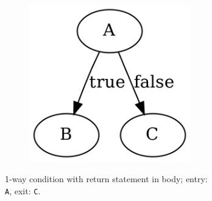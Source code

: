 \begin{savenotes}
\begin{figure}[htbp]
\begin{subfigure}[ht]{0.28\textwidth}
			\label{fig:if_else_graph_representation}
		\end{subfigure}
		\qquad
		\begin{subfigure}[ht]{0.30\textwidth}
			\centering
			\begin{subfigure}[ht]{0.45\textwidth}
				
			\end{subfigure}
			\begin{subfigure}[ht]{0.50\textwidth}
				\includegraphics[width=\textwidth]{inc/primitives/if_return.png}
			\end{subfigure}
			\caption{1-way condition with return statement in body; entry: \texttt{A}, exit: \texttt{C}.}
			\label{fig:if_return_graph_representation}
		\end{subfigure}
		\qquad
		\begin{subfigure}[ht]{0.32\textwidth}
			\centering
			\begin{subfigure}[ht]{0.45\textwidth}
				
			\end{subfigure}
			\begin{subfigure}[ht]{0.50\textwidth}

\end{subfigure}
\end{subfigure}
\end{figure}
\end{savenotes}
